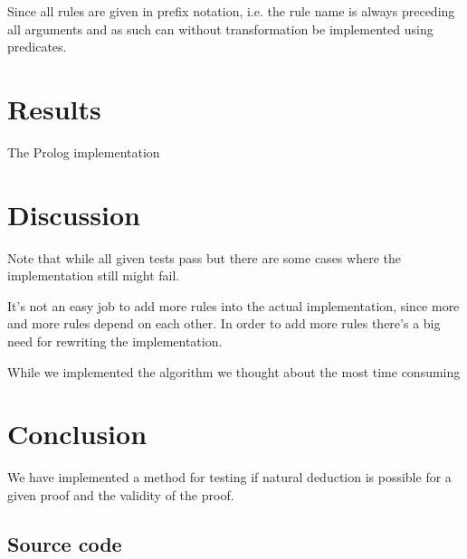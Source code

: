 \documentclass[a4paper,11pt]{article}
\begin{document}
Since all rules are given in prefix notation, i.e. the rule name is always preceding all arguments and as such can without transformation be implemented using predicates.
\section{Results}
The Prolog implementation
\section{Discussion}
Note that while all given tests pass but there are some cases where the implementation still might fail.

It's not an easy job to add more rules into the actual implementation, since more and more rules depend on each other.
In order to add more rules there's a big need for rewriting the implementation.

While we implemented the algorithm we thought about the most time consuming
\section{Conclusion}
We have implemented a method for testing if natural deduction is possible for a given proof and the validity of the proof.
\newpage
\begin{appendices}
\section{Source code}

\end{appendices}
\end{document}
